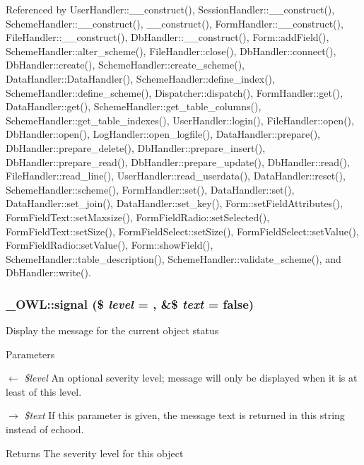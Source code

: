 Referenced by UserHandler::\_\-\_\-construct(), SessionHandler::\_\-\_\-construct(), SchemeHandler::\_\-\_\-construct(), \_\-\_\-construct(), FormHandler::\_\-\_\-construct(), FileHandler::\_\-\_\-construct(), DbHandler::\_\-\_\-construct(), Form::addField(), SchemeHandler::alter\_\-scheme(), FileHandler::close(), DbHandler::connect(), DbHandler::create(), SchemeHandler::create\_\-scheme(), DataHandler::DataHandler(), SchemeHandler::define\_\-index(), SchemeHandler::define\_\-scheme(), Dispatcher::dispatch(), FormHandler::get(), DataHandler::get(), SchemeHandler::get\_\-table\_\-columns(), SchemeHandler::get\_\-table\_\-indexes(), UserHandler::login(), FileHandler::open(), DbHandler::open(), LogHandler::open\_\-logfile(), DataHandler::prepare(), DbHandler::prepare\_\-delete(), DbHandler::prepare\_\-insert(), DbHandler::prepare\_\-read(), DbHandler::prepare\_\-update(), DbHandler::read(), FileHandler::read\_\-line(), UserHandler::read\_\-userdata(), DataHandler::reset(), SchemeHandler::scheme(), FormHandler::set(), DataHandler::set(), DataHandler::set\_\-join(), DataHandler::set\_\-key(), Form::setFieldAttributes(), FormFieldText::setMaxsize(), FormFieldRadio::setSelected(), FormFieldText::setSize(), FormFieldSelect::setSize(), FormFieldSelect::setValue(), FormFieldRadio::setValue(), Form::showField(), SchemeHandler::table\_\-description(), SchemeHandler::validate\_\-scheme(), and DbHandler::write().

\subsubsection[{signal}]{\setlength{\rightskip}{0pt plus 5cm}\_\-OWL::signal (\$ {\em level} = {}, \/  \&\$ {\em text} = {\ttfamily false})}\label{class__OWL_a51ba4a16409acf2a2f61f286939091a5}
Display the message for the current object status


\begin{DoxyParams}{Parameters}
\item[\mbox{$\leftarrow$} {\em \$level}]An optional severity level; message will only be displayed when it is at least of this level. \item[\mbox{$\rightarrow$} {\em \$text}]If this parameter is given, the message text is returned in this string instead of echood. \end{DoxyParams}
\begin{DoxyReturn}{Returns}
The severity level for this object 
\end{DoxyReturn}


